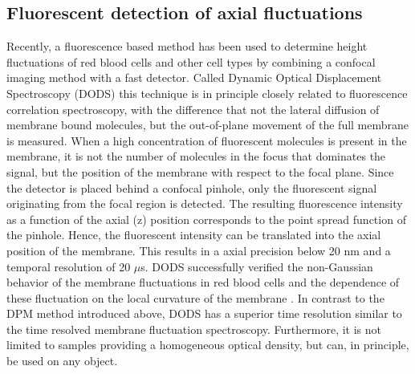 \documentclass[graybox]{svmult}
\begin{document}
	\subsection{Fluorescent detection of axial fluctuations}
Recently, a fluorescence based method has been used to determine height fluctuations of red blood cells and other cell types by combining a confocal imaging method with a fast detector. Called Dynamic Optical Displacement Spectroscopy (DODS) this technique is in principle closely related to fluorescence correlation spectroscopy, with the difference that not the lateral diffusion of membrane bound molecules, but the out-of-plane movement of the full membrane is measured. When a high concentration of fluorescent molecules is present in the membrane, it is not the number of molecules in the focus that dominates the signal, but the position of the membrane with respect to the focal plane. Since the detector is placed behind a confocal pinhole, only the fluorescent signal originating from the focal region is detected. The resulting fluorescence intensity as a function of the axial (z) position corresponds to the point spread function of the pinhole. Hence, the fluorescent intensity can be translated into the axial position of the membrane. This results in a axial precision below 20 nm and a temporal resolution of 20 $\mu$s. DODS successfully verified the non-Gaussian behavior of the membrane fluctuations in red blood cells and the dependence of these fluctuation on the local curvature of the membrane \cite{Monzel:2015}. In contrast to the DPM method introduced above, DODS has a superior time resolution similar to the time resolved membrane fluctuation spectroscopy. Furthermore, it is not limited to samples providing a homogeneous optical density, but can, in principle, be used on any object. 
\end{document}
